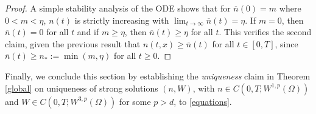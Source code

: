 \documentclass[12pt]{article}
\theoremstyle{plain}
\begin{document}
\begin{proof}
A simple stability analysis of the ODE shows that for $\overline{n}(0) = m$ where $0 < m < \eta$, $n(t)$ is strictly increasing with $\lim_{t \to \infty} \overline{n}(t) = \eta$. If $m = 0$, then $\overline{n}(t) = 0$ for all $t$ and if $m \ge \eta$, then $\overline{n}(t) \ge \eta$ for all $t$. This verifies the second claim, given the previous result that $n(t, x) \ge \overline{n}(t)$ for all $t \in [0, T]$, since $\overline{n}(t) \ge n_{*} := \min(m, \eta)$ for all $t \ge 0$.
\end{proof}

Finally, we conclude this section by establishing the \textit{uniqueness} claim in Theorem \ref{global} on uniqueness of strong solutions $(n, W)$, with $n \in C(0, T; W^{1, p}(\Omega))$ and $W \in C(0, T; W^{3, p}(\Omega))$ for some $p > d$, to \eqref{equations}.
\end{document}

